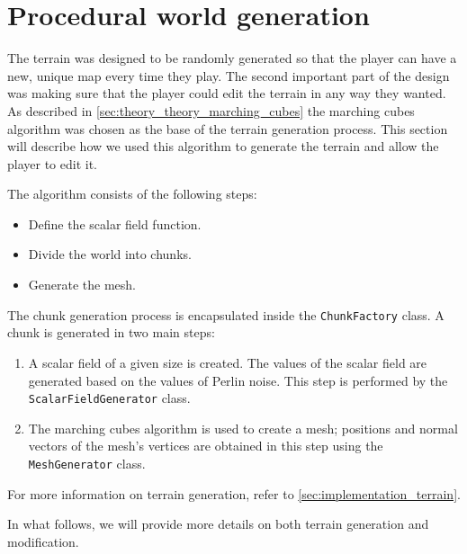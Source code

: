 \section{Procedural world generation} \label{sec:implementation_terrain}
The terrain was designed to be randomly generated so that the player can have a new, unique map every time they play.
The second important part of the design was making sure that the player could edit the terrain in any way they wanted.
As described in \autoref{sec:theory_theory_marching_cubes} the marching cubes algorithm was chosen as the base of the terrain generation process.
This section will describe how we used this algorithm to generate the terrain and allow the player to edit it.

The algorithm consists of the following steps:
\begin{itemize}
    \item Define the scalar field function.
    \item Divide the world into chunks.
    \item Generate the mesh.
\end{itemize}

The chunk generation process is encapsulated inside the \texttt{ChunkFactory} class.
A chunk is generated in two main steps:
\begin{enumerate}
    \item A scalar field of a given size is created.
          The values of the scalar field are generated based on the values of Perlin noise.
          This step is performed by the \texttt{ScalarFieldGenerator} class.
    \item The marching cubes algorithm is used to create a mesh;
          positions and normal vectors of the mesh's vertices are obtained in this step using the \texttt{MeshGenerator} class.
\end{enumerate}
For more information on terrain generation, refer to \autoref{sec:implementation_terrain}.

In what follows, we will provide more details on both terrain generation and modification.





